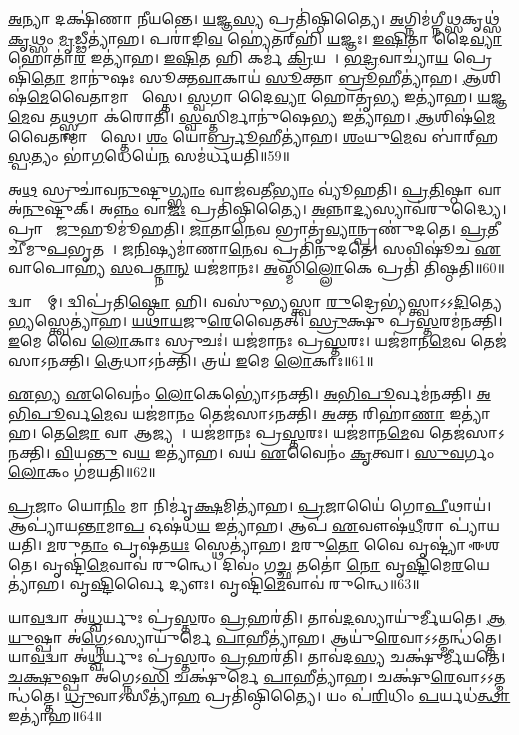 \ul{𑌅}𑌨𑍍𑌯𑌾 𑌦𑌕𑍍𑌷𑌿॑𑌣𑌾 𑌨𑍀𑌯𑌨𑍍𑌤𑍇।
\ul{𑌯}𑌜𑍍𑌞\ul{𑌸𑍍𑌯} 𑌪𑍍𑌰𑌤𑌿॑\-𑌷𑍍𑌠𑌿𑌤𑍍𑌯𑍈।
\ul{𑌅}𑌗𑍍𑌨𑌿𑌮॑𑌗𑍍𑌨𑍀\ul{𑌥𑍍𑌸}𑌕𑍃𑌥𑍍𑌸॑\ul{𑌕𑍃}𑌥𑍍𑌸𑌂 \ul{𑌮𑍃}𑌡𑍍𑌢𑍀𑌤𑍍𑌯𑌾॑𑌹।
𑌪𑌰𑌾॑𑌙𑌿\ul{𑌵} 𑌹𑍍𑌯𑍇॑𑌤𑌰𑍍‌\mbox{}𑌹𑌿॑ \ul{𑌯}𑌜𑍍𑌞𑌃।
\ul{𑌇}\ul{𑌷𑌿}𑌤𑌾 𑌦𑍈\ul{𑌵𑍍𑌯𑌾} 𑌹𑍋𑌤𑌾॑\ul{𑌰} 𑌇𑌤𑍍𑌯𑌾॑𑌹।
\ul{𑌇}\ul{𑌷𑌿}𑌤 𑌹𑌿 𑌕𑌰𑍍𑌮॑ \ul{𑌕𑍍𑌰𑌿}𑌯𑌤𑍇᳚।
\ul{𑌭}\ul{𑌦𑍍𑌰}𑌵𑌾𑌚𑍍𑌯𑌾॑\ul{𑌯} 𑌪𑍍𑌰𑍇𑌷𑌿॑\ul{𑌤𑍋} 𑌮𑌾𑌨𑍁॑𑌷𑌃 𑌸𑍂𑌕𑍍𑌤\ul{𑌵𑌾}𑌕𑌾𑌯॑ \ul{𑌸𑍂}𑌕𑍍𑌤𑌾 \ul{𑌬𑍍𑌰𑍂}𑌹𑍀𑌤𑍍𑌯𑌾॑𑌹।
\ul{𑌆}𑌶𑌿𑌷॑\ul{𑌮𑍇}𑌵𑍈𑌤𑌾𑌮𑌾 𑌶𑌾᳚𑌸𑍍𑌤𑍇।
\ul{𑌸𑍍𑌵}𑌗𑌾 𑌦𑍈\ul{𑌵𑍍𑌯𑌾} 𑌹𑍋𑌤𑍃॑\ul{𑌭𑍍𑌯} 𑌇𑌤𑍍𑌯𑌾॑𑌹।
\ul{𑌯}𑌜𑍍𑌞\ul{𑌮𑍇}𑌵 𑌤\ul{𑌥𑍍𑌸𑍍𑌵}𑌗𑌾 𑌕॑𑌰𑍋𑌤𑌿।
\ul{𑌸𑍍𑌵}𑌸𑍍𑌤𑌿𑌰𑍍𑌮𑌾𑌨𑍁॑𑌷𑍇\ul{𑌭𑍍𑌯} 𑌇𑌤𑍍𑌯𑌾॑𑌹।
\ul{𑌆}𑌶𑌿𑌷॑\ul{𑌮𑍇}𑌵𑍈𑌤𑌾𑌮𑌾 𑌶𑌾᳚𑌸𑍍𑌤𑍇।
\ul{𑌶𑌂} 𑌯𑍋\ul{𑌰𑍍𑌬𑍍𑌰𑍂}𑌹𑍀𑌤𑍍𑌯𑌾॑𑌹।
\ul{𑌶𑌂}𑌯𑍁\ul{𑌮𑍇}𑌵 𑌬𑌾॑𑌰𑍍‌\mbox{}𑌹\ul{𑌸𑍍𑌪}𑌤𑍍𑌯𑌂 𑌭𑌾॑\ul{𑌗}𑌧𑍇𑌯𑍇॑\ul{𑌨} 𑌸𑌮॑𑌰𑍍𑌧𑌯𑌤𑌿॥59॥\anuvakamend[\ul{𑌚}\ul{𑌰}\ul{𑌤𑍍𑌯}\ul{𑌧𑍍𑌵}𑌰𑍍𑌯𑍁𑌃 𑌪𑍍𑌰𑌜𑌾॑𑌤𑌿𑌰𑍍𑌹𑍍𑌵𑌯\ul{𑌤𑍇} 𑌵𑍇𑌦𑌾᳚𑌬𑍍𑌰𑌵𑍀𑌦𑍍𑌬𑌰𑍍‌\mbox{}\ul{𑌹𑌿}𑌷𑌦𑌂॑ 𑌕𑌰𑍋\ul{𑌤𑍍𑌯𑍃}𑌤𑍍𑌵𑌿𑌜𑍋॑ 𑌦𑌧𑌾𑌤𑌿 \ul{𑌬𑍍𑌰}𑌹𑍍𑌮𑌾\-𑌽𑌨𑍁॑𑌕𑌰𑍋𑌤𑌿 \ul{𑌚}𑌤𑍍𑌵𑌾𑌰𑌿॑ 𑌚]

𑌅\ul{𑌥} 𑌸𑍍𑌰𑍁𑌚𑌾॑𑌵\ul{𑌨𑍁}𑌷𑍍𑌟𑍁\ul{𑌗𑍍𑌭𑍍𑌯𑌾𑌂} 𑌵𑌾𑌜॑𑌵𑌤𑍀\ul{𑌭𑍍𑌯𑌾𑌂} 𑌵𑍍𑌯𑍂॑𑌹𑌤𑌿।
\ul{𑌪𑍍𑌰}\ul{𑌤𑌿}𑌷𑍍𑌠𑌾 𑌵𑌾 𑌅॑\ul{𑌨𑍁}𑌷𑍍𑌟𑍁𑌕𑍍।
𑌅\ul{𑌨𑍍𑌨𑌂} 𑌵𑌾\ul{𑌜𑌃} 𑌪𑍍𑌰𑌤𑌿॑\-𑌷𑍍𑌠𑌿𑌤𑍍𑌯𑍈।
\ul{𑌅}𑌨𑍍𑌨𑌾\ul{𑌦𑍍𑌯}𑌸𑍍𑌯𑌾𑌵॑𑌰𑍁𑌦𑍍𑌧𑍍𑌯𑍈।
𑌪𑍍𑌰𑌾𑌚𑍀𑌂᳚ \ul{𑌜𑍁}𑌹𑍂𑌮𑍂॑𑌹𑌤𑌿।
\ul{𑌜𑌾}𑌤𑌾\ul{𑌨𑍇}𑌵 𑌭𑍍𑌰𑌾𑌤𑍃॑\ul{𑌵𑍍𑌯𑌾}𑌨𑍍𑌪𑍍𑌰𑌣𑍁॑𑌦𑌤𑍇।
\ul{𑌪𑍍𑌰}𑌤𑍀𑌚𑍀॑𑌮𑍁\ul{𑌪}𑌭𑍃𑌤𑌮𑍍᳚।
\ul{𑌜}\ul{𑌨𑌿}𑌷𑍍𑌯𑌮𑌾॑𑌣𑌾\ul{𑌨𑍇}𑌵 𑌪𑍍𑌰𑌤𑌿॑\-𑌨𑍁𑌦𑌤𑍇।
𑌸𑌵𑌿𑌷𑍂॑𑌚 \ul{𑌏}𑌵𑌾𑌪𑍋𑌹𑍍𑌯॑ \ul{𑌸}𑌪\ul{𑌤𑍍𑌨𑌾}\ul{𑌨𑍍} 𑌯𑌜॑𑌮𑌾𑌨𑌃।
\ul{𑌅}𑌸𑍍𑌮𑌿𑌁\ul{𑌲𑍍𑌲𑍋}𑌕𑍇 𑌪𑍍𑌰𑌤𑌿॑ 𑌤𑌿𑌷𑍍𑌠𑌤𑌿॥60॥

𑌦𑍍𑌵𑌾𑌭𑍍𑌯𑌾᳚𑌮𑍍।
𑌦𑍍𑌵𑌿𑌪𑍍𑌰॑𑌤𑌿\ul{𑌷𑍍𑌠𑍋} 𑌹𑌿।
𑌵𑌸𑍁॑𑌭𑍍𑌯𑌸𑍍𑌤𑍍𑌵𑌾 \ul{𑌰𑍁}𑌦𑍍𑌰𑍇𑌭𑍍𑌯॑𑌸𑍍𑌤𑍍𑌵𑌾\-𑌽𑌽\ul{𑌦𑌿}𑌤𑍍𑌯𑍇\ul{𑌭𑍍𑌯}𑌸𑍍𑌤𑍍𑌵𑍇𑌤𑍍𑌯𑌾॑𑌹।
\ul{𑌯}\ul{𑌥𑌾}\ul{𑌯}𑌜𑍁\ul{𑌰𑍇}𑌵𑍈𑌤𑌤𑍍।
\ul{𑌸𑍍𑌰𑍁}𑌕𑍍𑌷𑍁 𑌪𑍍𑌰॑\ul{𑌸𑍍𑌤}𑌰𑌮॑𑌨𑌕𑍍𑌤𑌿।
\ul{𑌇}𑌮𑍇 𑌵𑍈 \ul{𑌲𑍋}𑌕𑌾𑌃 𑌸𑍍𑌰𑍁𑌚𑌃॑।
𑌯𑌜॑𑌮𑌾𑌨𑌃 𑌪𑍍𑌰\ul{𑌸𑍍𑌤}𑌰𑌃।
𑌯𑌜॑𑌮𑌾𑌨\ul{𑌮𑍇}𑌵 𑌤𑍇𑌜॑𑌸𑌾\-𑌽𑌨𑌕𑍍𑌤𑌿।
\ul{𑌤𑍍𑌰𑍇}𑌧𑌾\-𑌽𑌨॑𑌕𑍍𑌤𑌿।
𑌤𑍍𑌰𑌯॑ \ul{𑌇}𑌮𑍇 \ul{𑌲𑍋}𑌕𑌾𑌃॥61॥

\ul{𑌏}𑌭𑍍𑌯 \ul{𑌏}𑌵𑍈𑌨𑌂॑ \ul{𑌲𑍋}𑌕𑍇𑌭𑍍𑌯𑍋॑\-𑌽𑌨𑌕𑍍𑌤𑌿।
\ul{𑌅}\ul{𑌭𑌿}\ul{𑌪𑍂}𑌰𑍍𑌵𑌮॑𑌨𑌕𑍍𑌤𑌿।
\ul{𑌅}\ul{𑌭𑌿}\ul{𑌪𑍂}𑌰𑍍𑌵\ul{𑌮𑍇}𑌵 𑌯𑌜॑𑌮𑌾\ul{𑌨𑌂} 𑌤𑍇𑌜॑𑌸𑌾\-𑌽𑌨𑌕𑍍𑌤𑌿।
\ul{𑌅}𑌕𑍍𑌤 𑌰𑌿𑌹𑌾॑\ul{𑌣𑌾} 𑌇𑌤𑍍𑌯𑌾॑𑌹।
𑌤𑍇\ul{𑌜𑍋} 𑌵𑌾 𑌆𑌜𑍍𑌯𑌮𑍍᳚।
𑌯𑌜॑𑌮𑌾𑌨𑌃 𑌪𑍍𑌰\ul{𑌸𑍍𑌤}𑌰𑌃।
𑌯𑌜॑𑌮𑌾𑌨\ul{𑌮𑍇}𑌵 𑌤𑍇𑌜॑𑌸𑌾\-𑌽𑌨𑌕𑍍𑌤𑌿।
\ul{𑌵𑌿}𑌯\ul{𑌨𑍍𑌤𑍁} 𑌵\ul{𑌯} 𑌇𑌤𑍍𑌯𑌾॑𑌹।
𑌵𑌯॑ \ul{𑌏}𑌵𑍈𑌨𑌂॑ \ul{𑌕𑍃}𑌤𑍍𑌵𑌾।
\ul{𑌸𑍁}\ul{𑌵}𑌰𑍍𑌗𑌂 \ul{𑌲𑍋}𑌕𑌂 𑌗॑𑌮𑌯𑌤𑌿॥62॥

\ul{𑌪𑍍𑌰}𑌜𑌾𑌂 𑌯𑍋\ul{𑌨𑌿𑌂} 𑌮𑌾 𑌨𑌿𑌰𑍍𑌮𑍃॑\ul{𑌕𑍍𑌷}𑌮𑌿𑌤𑍍𑌯𑌾॑𑌹।
\ul{𑌪𑍍𑌰}𑌜𑌾𑌯𑍈॑ 𑌗𑍋\ul{𑌪𑍀}𑌥𑌾𑌯॑।
𑌆𑌪𑍍𑌯𑌾॑𑌯\ul{𑌨𑍍𑌤𑌾}𑌮𑌾\ul{𑌪} 𑌓𑌷॑𑌧\ul{𑌯} 𑌇𑌤𑍍𑌯𑌾॑𑌹।
𑌆𑌪॑ \ul{𑌏}𑌵𑍗𑌷॑\ul{𑌧𑍀}𑌰𑌾 𑌪𑍍𑌯𑌾॑𑌯𑌯𑌤𑌿।
\ul{𑌮}𑌰𑍁\ul{𑌤𑌾𑌂} 𑌪𑍃𑌷॑𑌤\ul{𑌯𑌃} 𑌸𑍍𑌥𑍇𑌤𑍍𑌯𑌾॑𑌹।
\ul{𑌮}𑌰𑍁\ul{𑌤𑍋} 𑌵𑍈 𑌵𑍃𑌷𑍍𑌟𑍍𑌯𑌾॑ 𑌈𑌶𑌤𑍇।
𑌵𑍃𑌷𑍍𑌟𑌿॑\ul{𑌮𑍇}𑌵𑌾𑌵॑ 𑌰𑍁𑌨𑍍𑌧𑍇।
𑌦𑌿𑌵𑌂॑ 𑌗\ul{𑌚𑍍𑌛} 𑌤𑌤𑍋॑ \ul{𑌨𑍋} 𑌵𑍃\ul{𑌷𑍍𑌟𑌿}𑌮𑍇\ul{𑌰}𑌯𑍇𑌤𑍍𑌯𑌾॑𑌹।
𑌵𑍃\ul{𑌷𑍍𑌟𑌿}𑌰𑍍𑌵𑍈 𑌦𑍍𑌯𑍗𑌃।
𑌵𑍃𑌷𑍍𑌟𑌿॑\ul{𑌮𑍇}𑌵𑌾𑌵॑ 𑌰𑍁𑌨𑍍𑌧𑍇॥63॥

𑌯𑌾\ul{𑌵}𑌦𑍍𑌵𑌾 𑌅॑\ul{𑌧𑍍𑌵}𑌰𑍍𑌯𑍁𑌃 𑌪𑍍𑌰॑\ul{𑌸𑍍𑌤}𑌰𑌂 \ul{𑌪𑍍𑌰}𑌹𑌰॑𑌤𑌿।
𑌤𑌾𑌵॑\ul{𑌦}𑌸𑍍𑌯𑌾𑌯𑍁॑𑌰𑍍𑌮𑍀𑌯𑌤𑍇।
\ul{𑌆}\ul{𑌯𑍁}𑌷𑍍𑌪𑌾 𑌅॑\ul{𑌗𑍍𑌨𑍇}\-𑌽𑌸𑍍𑌯𑌾𑌯𑍁॑𑌰𑍍𑌮𑍇 \ul{𑌪𑌾}𑌹𑍀𑌤𑍍𑌯𑌾॑𑌹।
𑌆𑌯𑍁॑\ul{𑌰𑍇}𑌵𑌾𑌽𑌽𑌤𑍍𑌮𑌨𑍍𑌧॑𑌤𑍍𑌤𑍇।
𑌯𑌾\ul{𑌵}𑌦𑍍𑌵𑌾 𑌅॑\ul{𑌧𑍍𑌵}𑌰𑍍𑌯𑍁𑌃 𑌪𑍍𑌰॑\ul{𑌸𑍍𑌤}𑌰𑌂 \ul{𑌪𑍍𑌰}𑌹𑌰॑𑌤𑌿।
𑌤𑌾𑌵॑𑌦\ul{𑌸𑍍𑌯} 𑌚𑌕𑍍𑌷𑍁॑𑌰𑍍𑌮𑍀𑌯𑌤𑍇।
\ul{𑌚}\ul{𑌕𑍍𑌷𑍁}𑌷𑍍𑌪𑌾 𑌅॑𑌗𑍍𑌨𑍇𑌽\ul{𑌸𑌿} 𑌚𑌕𑍍𑌷𑍁॑𑌰𑍍𑌮𑍇 \ul{𑌪𑌾}𑌹𑍀𑌤𑍍𑌯𑌾॑𑌹।
𑌚𑌕𑍍𑌷𑍁॑\ul{𑌰𑍇}𑌵𑌾𑌽𑌽𑌤𑍍𑌮𑌨𑍍𑌧॑𑌤𑍍𑌤𑍇।
\ul{𑌧𑍍𑌰𑍁}𑌵𑌾\-𑌽𑌸𑍀𑌤𑍍𑌯𑌾॑\ul{𑌹} 𑌪𑍍𑌰𑌤𑌿॑\-𑌷𑍍𑌠𑌿𑌤𑍍𑌯𑍈।
𑌯𑌂 𑌪॑\ul{𑌰𑌿}𑌧𑌿𑌂 \ul{𑌪}𑌰𑍍𑌯𑌧॑\ul{𑌤𑍍𑌥𑌾} 𑌇𑌤𑍍𑌯𑌾॑𑌹॥64॥

